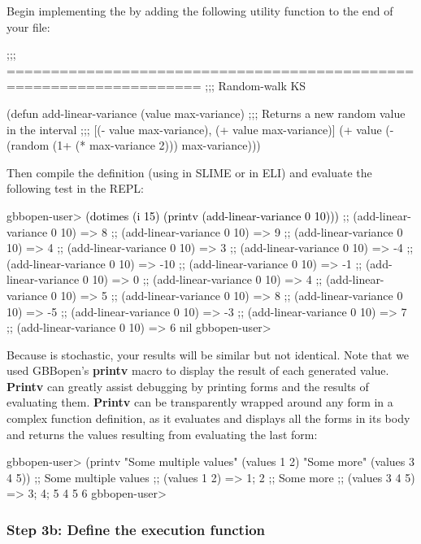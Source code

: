\documentclass[10pt,twoside,english,pdftex]{article}
\begin{document}
Begin implementing the  by adding the following
utility function to the end of your  file:
%
\W\supp
\begin{example}
  ;;; ====================================================================
  ;;;   Random-walk KS

  (defun add-linear-variance (value max-variance)
    ;;; Returns a new random value in the interval
    ;;; [(- value max-variance), (+ value max-variance)]
    (+ value (- (random (1+ (* max-variance 2))) max-variance)))
\end{example}
%
Then compile the definition (using  in SLIME or  in ELI) and evaluate the following test in the REPL:
%
%
%
\W\supp\notpretop
\begin{example}
\textcolor{darkergray}{%
  gbbopen-user> \textcolor{black}{(dotimes (i 15) (printv (add-linear-variance 0 10)))}
  ;;  (add-linear-variance 0 10) => 8
  ;;  (add-linear-variance 0 10) => 9
  ;;  (add-linear-variance 0 10) => 4
  ;;  (add-linear-variance 0 10) => 3
  ;;  (add-linear-variance 0 10) => -4
  ;;  (add-linear-variance 0 10) => -10
  ;;  (add-linear-variance 0 10) => -1
  ;;  (add-linear-variance 0 10) => 0
  ;;  (add-linear-variance 0 10) => 4
  ;;  (add-linear-variance 0 10) => 5
  ;;  (add-linear-variance 0 10) => 8
  ;;  (add-linear-variance 0 10) => -5
  ;;  (add-linear-variance 0 10) => -3
  ;;  (add-linear-variance 0 10) => 7
  ;;  (add-linear-variance 0 10) => 6
  nil
  gbbopen-user>}
\end{example}

Because  is stochastic, your results will be
similar but not identical.  Note that we used GBBopen's \textbf{printv}
macro to display the result of each generated value.  \textbf{Printv} can
greatly assist debugging by printing forms and the results of evaluating
them.  \textbf{Printv} can be transparently wrapped around any form in a
complex function definition, as it evaluates and displays all the forms in
its body and returns the values resulting from evaluating the last form:
%
\W\supp
\begin{example}
\textcolor{darkergray}{%
  gbbopen-user>  (printv "Some multiple values" (values 1 2) "Some more" (values 3 4 5))
  ;; Some multiple values
  ;;  (values 1 2) => 1; 2
  ;; Some more
  ;;  (values 3 4 5) => 3; 4; 5
  4
  5
  6
  gbbopen-user>}
\end{example}

\subsubsection*{Step 3b: Define the  execution function}
\end{document}
